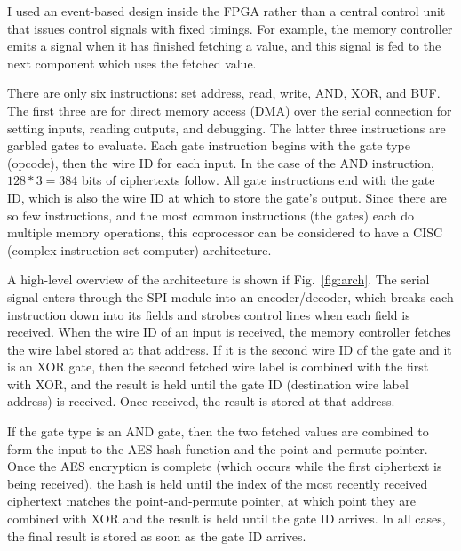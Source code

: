 I used an event-based design inside the FPGA rather than a central control unit that issues control signals with fixed timings. For example, the memory controller emits a signal when it has finished fetching a value, and this signal is fed to the next component which uses the fetched value.

There are only six instructions: set address, read, write, AND, XOR, and BUF. The first three are for direct memory access (DMA) over the serial connection for setting inputs, reading outputs, and debugging. The latter three instructions are garbled gates to evaluate. Each gate instruction begins with the gate type (opcode), then the wire ID for each input. In the case of the AND instruction, $128*3=384$ bits of ciphertexts follow. All gate instructions end with the gate ID, which is also the wire ID at which to store the gate's output. Since there are so few instructions, and the most common instructions (the gates) each do multiple memory operations, this coprocessor can be considered to have a CISC (complex instruction set computer) architecture.

A high-level overview of the architecture is shown if Fig.~\ref{fig:arch}. The serial signal enters through the SPI module into an encoder/decoder, which breaks each instruction down into its fields and strobes control lines when each field is received. When the wire ID of an input is received, the memory controller fetches the wire label stored at that address. If it is the second wire ID of the gate and it is an XOR gate, then the second fetched wire label is combined with the first with XOR, and the result is held until the gate ID (destination wire label address) is received. Once received, the result is stored at that address.

If the gate type is an AND gate, then the two fetched values are combined to form the input to the AES hash function and the point-and-permute pointer. Once the AES encryption is complete (which occurs while the first ciphertext is being received), the hash is held until the index of the most recently received ciphertext matches the point-and-permute pointer, at which point they are combined with XOR and the result is held until the gate ID arrives. In all cases, the final result is stored as soon as the gate ID arrives.



